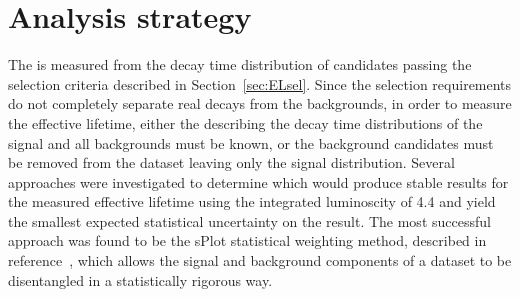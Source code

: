\section{Analysis strategy}
\label{sec:fitstrategy}


The \bsmumu \el is measured from the decay time distribution of \bsmumu candidates passing the selection criteria described in Section~\ref{sec:ELsel}. Since the selection requirements do not completely separate real \bsmumu decays from the backgrounds, in order to measure the \bsmumu effective lifetime, either the \pdfs describing the decay time distributions of the signal and all backgrounds must be known, or the background candidates must be removed from the dataset leaving only the signal distribution. Several approaches were investigated to determine which would produce stable results for the measured \bsmumu effective lifetime using the integrated luminoscity of 4.4 \fb and yield the smallest expected statistical uncertainty on the result. The most successful approach was found to be the sPlot statistical weighting method, described in reference~\cite{Pivk:2004ty}, which allows the signal and background components of a dataset to be disentangled in a statistically rigorous way. %

